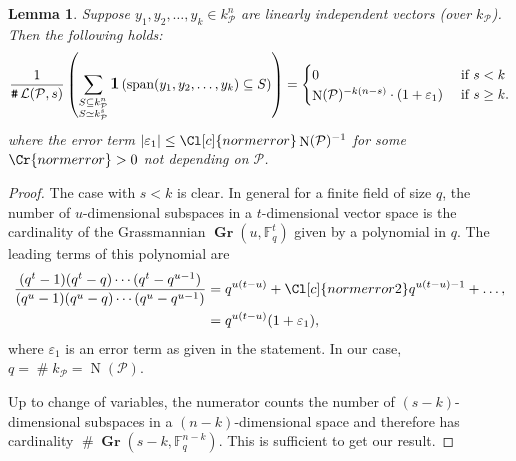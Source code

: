 \documentclass{amsart}
\newtheorem{lemma}[theorem]{Lemma}
\theoremstyle{definition}
\theoremstyle{remark}
\DeclareMathOperator{\card}{\texttt{\#}}
\DeclareMathOperator{\spant}{span}
\DeclareMathOperator{\ind}{\mathlarger{\mathbf{1}}}
\DeclareMathOperator{\N}{N}
\DeclareMathOperator{\Gr}{\mathbf{Gr}}
\begin{document}
\begin{lemma}
    \label{le:counting}
    Suppose $y_1, y_2,\dots,y_k \in k_{\mathcal{P}}^{n}$ are linearly independent vectors (over $k_{\mathcal{P}}$). Then the following holds:
    {\small\begin{equation}
            \frac{  1}{\card \mathcal{L}(\mathcal{P},s)} 
            \left(
                \sum_{\substack{  S \subseteq k_\mathcal{P}^{n} \\  S \simeq k_{\mathcal{P}}^{s} } } 
                \ind\left(
                    \spant
                    ( y_1,y_2,\dots,y_k) \subseteq S
            \right) \right) = \begin{cases}
                0 &  \text{ if $s<k$}\\
                \N(\mathcal{P})^{-k(n-s)}\cdot (1+ \varepsilon_{1}) &  \text{ if $s \geq k$.}
            \end{cases}
    \end{equation}}
    where the error term $|\varepsilon_{1}| \leq \Cl[c]{normerror} \N(\mathcal{P})^{-1}$ for some $\Cr{normerror}>0$ not depending on $\mathcal{P}$.
\end{lemma}
\begin{proof}
    The case with $s < k $ is clear. 
    In general for a finite field of size $q$, the number of $u$-dimensional subspaces in a $t$-dimensional vector space is the cardinality of the Grassmannian $\Gr(u,\mathbb{F}_q^t)$ given by a polynomial in $q$. The leading terms of this polynomial are
    \begin{align}
        \frac{(q^t-1)(q^t-q)\cdots (q^t-q^{u-1})}{(q^u-1)(q^u-q)\cdots (q^u-q^{u-1})}
 & = q^{u(t-u)} + \Cl[c]{normerror2} q^{u(t-u)-1} + \dots ,\\
 & =  q^{u(t-u)} ( 1 + \varepsilon_{1}),
    \end{align}
    where $\varepsilon_{1}$ is an error term as given in the statement.
    In our case, $q=\card k_\mathcal{P}= \N(\mathcal{P})$. 

    Up to change of variables, the numerator counts the number of $(s-k)$-dimensional subspaces in a $(n-k)$-dimensional space and therefore has cardinality $\card \Gr(s-k,\mathbb{F}_q^{n-k})$. 
    This is sufficient to get our result.
\end{proof}
\end{document}
